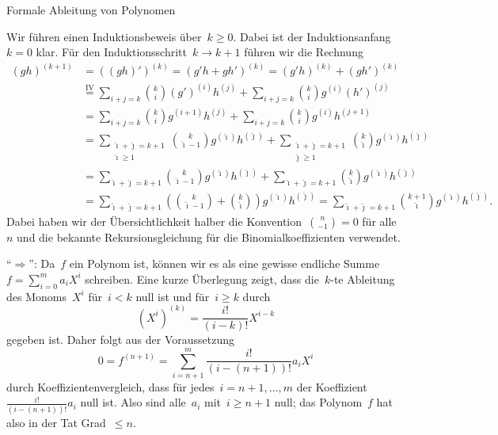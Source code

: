 \documentclass{algblatt}
\begin{document}
\begin{aufgabe}{Formale Ableitung von Polynomen}
\ifloesungen\newpage\fi
\begin{loesungE}
\item Wir führen einen Induktionsbeweis über~$k \geq 0$.
Dabei ist der Induktionsanfang~$k = 0$ klar. Für den Induktionsschritt~$k \to k
+ 1$ führen wir die Rechnung
\begin{align*}
  (gh)^{(k+1)} &=
  ((gh)')^{(k)} = (g'h + gh')^{(k)} = (g'h)^{(k)} + (gh')^{(k)} \\
  &\stackrel{\text{IV}}{=}
    \sum_{i+j=k} \binom{k}{i} (g')^{(i)} h^{(j)} +
    \sum_{i+j=k} \binom{k}{i} g^{(i)} (h')^{(j)} \\
  &=
    \sum_{i+j=k} \binom{k}{i} g^{(i+1)} h^{(j)} +
    \sum_{i+j=k} \binom{k}{i} g^{(i)} h^{(j+1)} \\
  &=
    \sum_{\substack{\hat\imath+\hat\jmath=k+1\\\hat\imath\geq1}} \binom{k}{\hat\imath - 1} g^{(\hat\imath)} h^{(\hat\jmath)} +
    \sum_{\substack{\hat\imath+\hat\jmath=k+1\\\hat\jmath\geq1}} \binom{k}{\hat\imath} g^{(\hat\imath)} h^{(\hat\jmath)} \\
  &=
    \sum_{\hat\imath+\hat\jmath=k+1} \binom{k}{\hat\imath - 1} g^{(\hat\imath)} h^{(\hat\jmath)} +
    \sum_{\hat\imath+\hat\jmath=k+1} \binom{k}{\hat\imath} g^{(\hat\imath)} h^{(\hat\jmath)} \\
  &= \sum_{\hat\imath+\hat\jmath=k+1}
    \left(\binom{k}{\hat\imath - 1} + \binom{k}{\hat\imath}\right) g^{(\hat\imath)} h^{(\hat\jmath)}
  = \sum_{\hat\imath+\hat\jmath=k+1}
    \binom{k+1}{\hat\imath} g^{(\hat\imath)} h^{(\hat\jmath)}.
\end{align*}
Dabei haben wir der Übersichtlichkeit halber die Konvention~$\binom{n}{-1} = 0$
für alle~$n$ und die bekannte Rekursionsgleichung für die Binomialkoeffizienten
verwendet.

\item "`$\Longrightarrow$"': Da~$f$ ein Polynom ist, können wir es als eine gewisse
endliche Summe~$f = \sum_{i=0}^m a_i X^i$ schreiben. Eine kurze Überlegung
zeigt, dass die~$k$-te Ableitung des Monoms~$X^i$ für~$i < k$ null ist und
für~$i \geq k$ durch
\[ (X^i)^{(k)} = \frac{i!}{(i-k)!} X^{i-k} \]
gegeben ist. Daher folgt aus der Voraussetzung
\[ 0 = f^{(n+1)} = \sum_{i=n+1}^m \frac{i!}{(i-(n+1))!} a_i X^i \]
durch Koeffizientenvergleich, dass für jedes~$i = n+1,\ldots,m$ der
Koeffizient~$\frac{i!}{(i-(n+1))!} a_i$ null ist. Also sind alle~$a_i$ mit~$i
\geq n+1$ null; das Polynom~$f$ hat also in der Tat Grad~$\leq n$.


\end{loesungE}
\end{aufgabe}
\end{document}
